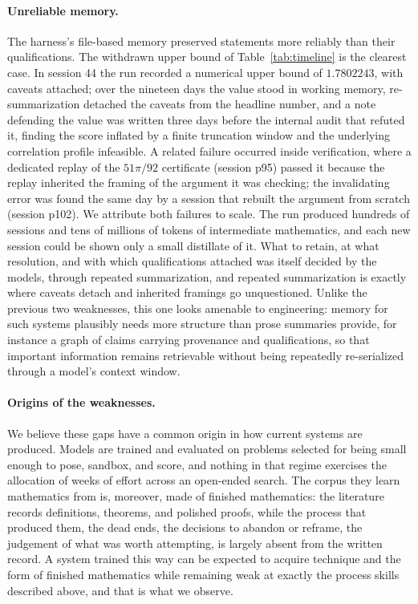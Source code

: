 \paragraph{Unreliable memory.}
The harness's file-based memory preserved statements more reliably than
their qualifications. The withdrawn upper bound of Table~\ref{tab:timeline}
is the clearest case. In session 44 the run recorded a numerical upper
bound of $1.7802243$, with caveats attached; over the nineteen days the
value stood in working memory, re-summarization detached the caveats from
the headline number, and a note defending the value was written three days
before the internal audit that refuted it, finding the score inflated by a
finite truncation window and the underlying correlation profile
infeasible. A related failure occurred inside verification, where a
dedicated replay of the $51\pi/92$ certificate (session p95) passed it
because the replay inherited the framing of the argument it was checking;
the invalidating error was found the same day by a session that rebuilt the
argument from scratch (session p102). We attribute both failures to scale.
The run produced hundreds of sessions and tens of millions of tokens of
intermediate mathematics, and each new session could be shown only a small
distillate of it. What to retain, at what resolution, and with which
qualifications attached was itself decided by the models, through repeated
summarization, and repeated summarization is exactly where caveats detach
and inherited framings go unquestioned. Unlike the previous two weaknesses,
this one looks amenable to engineering: memory for such systems plausibly
needs more structure than prose summaries provide, for instance a graph of
claims carrying provenance and qualifications, so that important
information remains retrievable without being repeatedly re-serialized
through a model's context window.

\paragraph{Origins of the weaknesses.}
We believe these gaps have a common origin in how current systems are
produced. Models are trained and evaluated on problems selected for being
small enough to pose, sandbox, and score, and nothing in that regime
exercises the allocation of weeks of effort across an open-ended search.
The corpus they learn mathematics from is, moreover, made of finished
mathematics: the literature records definitions, theorems, and polished
proofs, while the process that produced them, the dead ends, the decisions
to abandon or reframe, the judgement of what was worth attempting, is
largely absent from the written record. A system trained this way can be
expected to acquire technique and the form of finished mathematics while
remaining weak at exactly the process skills described above, and that is
what we observe.

